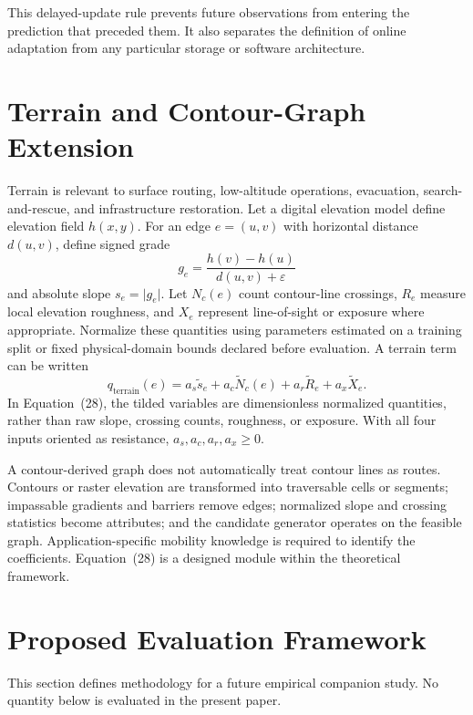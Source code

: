 \documentclass[11pt,letterpaper]{article}
\begin{document}
This delayed-update rule prevents future observations from entering the prediction that preceded them. It also separates the definition of online adaptation from any particular storage or software architecture.

\section{Terrain and Contour-Graph Extension}
\label{sec:terrain}

Terrain is relevant to surface routing, low-altitude operations, evacuation, search-and-rescue, and infrastructure restoration. Let a digital elevation model define elevation field $h(x,y)$. For an edge $e=(u,v)$ with horizontal distance $d(u,v)$, define signed grade
\begin{equation}
g_e=\frac{h(v)-h(u)}{d(u,v)+\varepsilon}
\end{equation}
and absolute slope $s_e=\lvert g_e\rvert$. Let $N_c(e)$ count contour-line crossings, $R_e$ measure local elevation roughness, and $X_e$ represent line-of-sight or exposure where appropriate. Normalize these quantities using parameters estimated on a training split or fixed physical-domain bounds declared before evaluation. A terrain term can be written
\begin{equation}
q_{\mathrm{terrain}}(e)
=a_s\widetilde s_e+a_c\widetilde N_c(e)
+a_r\widetilde R_e+a_x\widetilde X_e.
\end{equation}
In Equation~(28), the tilded variables are dimensionless normalized quantities, rather than raw slope, crossing counts, roughness, or exposure. With all four inputs oriented as resistance, $a_s,a_c,a_r,a_x\geq0$.

A contour-derived graph does not automatically treat contour lines as routes. Contours or raster elevation are transformed into traversable cells or segments; impassable gradients and barriers remove edges; normalized slope and crossing statistics become attributes; and the candidate generator operates on the feasible graph. Application-specific mobility knowledge is required to identify the coefficients. Equation~(28) is a designed module within the theoretical framework.

\section{Proposed Evaluation Framework}

This section defines methodology for a future empirical companion study. No quantity below is evaluated in the present paper.
\end{document}
